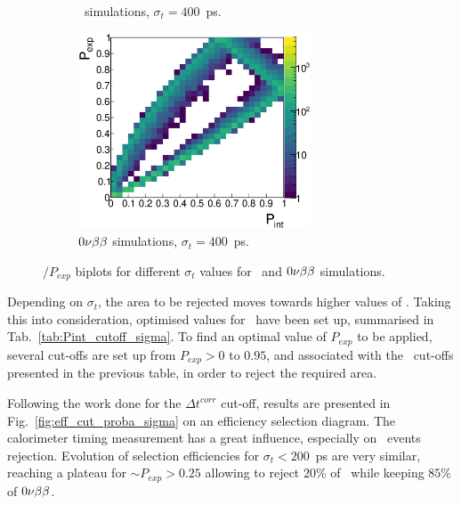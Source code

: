 \begin{figure}[!h]
\begin{subfigure}[t]{0.49\textwidth}
  \captionsetup{justification=justified}
  \caption{\Tl\ simulations, ${\sigma_{t}=400}$~ps.
    \label{subfig:}}
\end{subfigure}
\hfill
\begin{subfigure}[t]{0.49\textwidth}
  \centering
  \includegraphics[width=0.76\textwidth]{timedifference/fig_timediff/PintVSPexp_0nubb_400.eps}
  \captionsetup{justification=justified}
  \caption{$0\nu\beta\beta$ simulations, ${\sigma_{t}=400}$~ps.
    \label{subfig:}}
\end{subfigure}
\caption{\Pint$/P_{exp}$ biplots for different $\sigma_{t}$ values for \Tl\ and $0\nu\beta\beta$ simulations.
  \label{fig:biplot_Pexp_Pint_sigma}}
\end{figure}
Depending on $\sigma_{t}$, the area to be rejected moves towards higher values of \Pint.
Taking this into consideration, optimised values for \Pint\ have been set up, summarised in Tab.~\ref{tab:Pint_cutoff_sigma}.
To find an optimal value of $P_{exp}$ to be applied, several cut-offs are set up from $P_{exp}>0$ to $0.95$, and associated with the \Pint\ cut-offs presented in the previous table, in order to reject the required area.

Following the work done for the $\Delta t^{corr}$ cut-off, results are presented in Fig.~\ref{fig:eff_cut_proba_sigma} on an efficiency selection diagram.
The calorimeter timing measurement has a great influence, especially on \Tl\ events rejection.
Evolution of selection efficiencies for ${\sigma_{t}<200}$~ps are very similar, reaching a plateau for ${\sim P_{exp}>0.25}$ allowing to reject $20$\% of \Tl\ while keeping $85$\% of $0\nu\beta\beta$.

